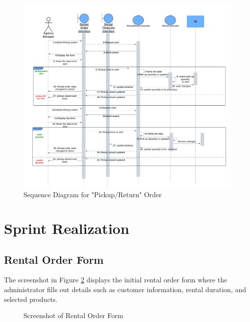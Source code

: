 \begin{figure}[h]
    \centering
    \includegraphics[width=1\textwidth]{sprint2/Sprint2Sequence2.png}
    \caption{Sequence Diagram for "Pickup/Return" Order}
    \label{fig:pickup_return_ordersequence_diagram}
\end{figure}

\section{Sprint Realization}
\subsection{Rental Order Form}
The screenshot in Figure \ref{fig:rental_order_form} displays the initial rental order form where the administrator fills out details such as customer information, rental duration, and selected products.
\newpage
\begin{figure}[h]
    \centering
    \caption{Screenshot of Rental Order Form}
    \label{fig:rental_order_form}
\end{figure}

